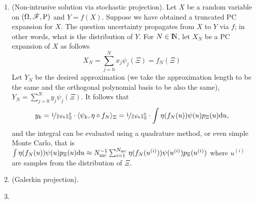 \documentclass[a4paper,10pt]{scrbook}
\begin{document}
\begin{enumerate}
 \item (Non-intrusive solution via stochastic projection). Let \(X\) be a random variable on \((\Omega,\mathscr{F},\mathrm{P})\) and \(Y=f(X)\). Suppose we have obtained a
       truncated PC expansion for \(X\). The question uncertainty propagates from \(X\) to \(Y\)
       via \(f\); in other words, what is the distribution of \(Y\). For \(N\in\N\), let \(X_N\) be 
       a PC expansion of \(X\) as follows
       \[
        X_N = \sum_{j=0}^{N} x_j \psi_j(\Xi) = f_N(\Xi)
       \]
       Let \(Y_N\) be the desired approximation (we take the approximation length to be the same and 
       the orthogonal polynomial basis to be also the same), 
       \(
        Y_N = \sum_{j=0}^{N} y_j \psi_j(\Xi).
       \)
       It follows that 
       \[
        y_k = \nicefrac{1}{\|\psi_k\|^2_\Xi} \cdot \langle\psi_k, \eta\circ f_N\rangle_\Xi =  \nicefrac{1}{\|\psi_k\|^2_\Xi} \cdot \int \eta(f_N(u)) \psi(u) p_\Xi(u) \mathrm{d} u,
       \]
       and the integral can be evaluated using a quadrature method, or even simple Monte Carlo, that is
       \(
       \int \eta(f_N(u)) \psi(u) p_\Xi(u) \mathrm{d} u 
       \approx 
       N_{\mathrm{mc}}^{-1}\sum_{i=1}^{N_{\mathrm{mc}}} \eta(f_N(u^{(i)})) \psi(u^{(i)}) p_\Xi(u^{(i)})
       \)
       where \(u^{(i)}\) are samples from the distribution of \(\Xi\).

  \item (Galerkin projection).
  
  \item 
\end{enumerate}
\end{document}
